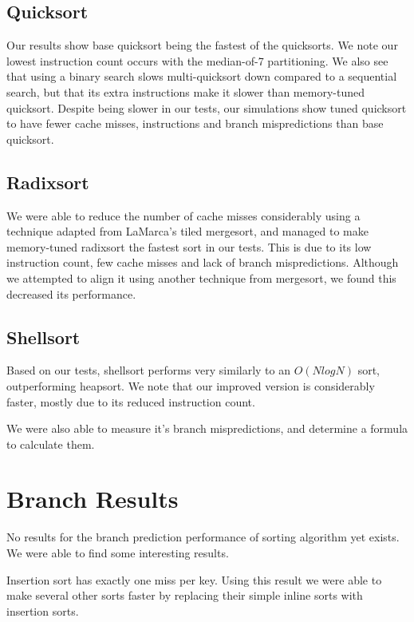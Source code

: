 \subsection{Quicksort}

Our results show base quicksort being the fastest of the quicksorts. We note our
lowest instruction count occurs with the median-of-7 partitioning. We also see
that using a binary search slows multi-quicksort down compared to a sequential
search, but that its extra instructions make it slower than memory-tuned
quicksort.  Despite being slower in our tests, our simulations show tuned
quicksort to have fewer cache misses, instructions and branch mispredictions
than base quicksort.

\subsection{Radixsort}

We were able to reduce the number of cache misses considerably using a technique
adapted from LaMarca's tiled mergesort, and managed to make memory-tuned radixsort the
fastest sort in our tests. This is due to its low instruction count, few cache
misses and lack of branch mispredictions. Although we attempted to align it
using another technique from mergesort, we found this decreased its performance.

\subsection{Shellsort}

Based on our tests, shellsort performs very similarly to an $O(NlogN)$ sort,
outperforming heapsort. We note that our improved version is considerably
faster, mostly due to its reduced instruction count.

We were also able to measure it's branch mispredictions, and determine a formula
to calculate them.

\section{Branch Results}

No results for the branch prediction performance of sorting algorithm yet
exists. We were able to find some interesting results.

Insertion sort has exactly one miss per key. Using this result we were able to
make several other sorts faster by replacing their simple inline sorts with
insertion sorts.

